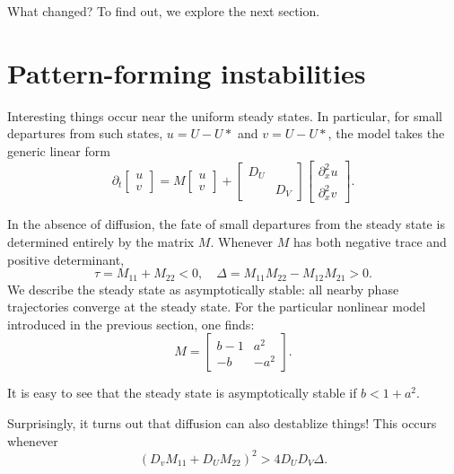 \documentclass{book}
\theoremstyle{definition}
\newcommand{\p}{\partial}
\begin{document}
What changed? To find out, we explore the next section. 






\section{Pattern-forming instabilities}


Interesting things occur near the uniform steady states. In particular, for small departures from such states, $u = U - U*$ and $v = U - U*$, the model takes the generic linear form
\begin{equation*}
\p_t \begin{bmatrix}
u \\ v
\end{bmatrix}
= 
M 
\begin{bmatrix}
u \\ v
\end{bmatrix} + 
 \begin{bmatrix}
D_U & \\ & D_V 
\end{bmatrix}\begin{bmatrix}
\p_x^2 u\\ \p_x^2 v
\end{bmatrix}.
\end{equation*}


In the absence of diffusion, the fate of small departures from the steady state is determined entirely
by the matrix $M$. Whenever $M$ has both negative trace and positive determinant,
\begin{equation*}
\tau = M_{11} + M_{22} < 0, \quad \Delta = M_{11} M_{22} - M_{12} M_{21} > 0.
\end{equation*}
We describe the steady state as asymptotically stable: all nearby phase trajectories converge at the
steady state. For the particular nonlinear model introduced in the previous section, one finds:
\begin{equation*}
M = \begin{bmatrix}
b-1 & a^2 \\ -b & -a^2
\end{bmatrix}.
\end{equation*}

It is easy to see that the steady state is asymptotically stable if $b < 1+a^2$.


Surprisingly, it turns out that diffusion can also destablize things! This occurs whenever
\begin{equation*}
(D_v M_{11} + D_U M_{22})^2 > 4 D_U D_V \Delta.
\end{equation*}
\end{document}

